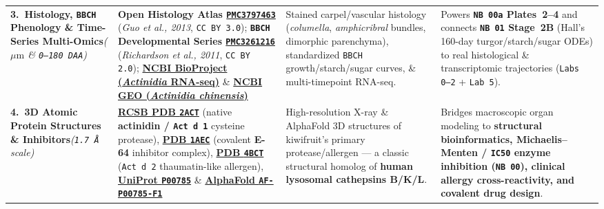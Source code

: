 \documentclass[10pt,a4paper]{article}
\begin{document}
{\begin{xltabular}{\textwidth}{L{2.55cm} L{4.85cm} L{4.25cm} Y}
\textbf{3.\ Histology, \texttt{BBCH} Phenology \& Time-Series Multi-Omics}\newline \textit{($\mu\text{m}$ \& \texttt{0--180\,DAA})} &
\textbf{Open Histology Atlas \href{https://pmc.ncbi.nlm.nih.gov/articles/PMC3797463/}{\texttt{PMC3797463}}} (\textit{Guo et al., 2013}, \texttt{CC BY 3.0}); \textbf{\texttt{BBCH} Developmental Series \href{https://pmc.ncbi.nlm.nih.gov/articles/PMC3261216/}{\texttt{PMC3261216}}} (\textit{Richardson et al., 2011}, \texttt{CC BY 2.0}); \href{https://www.ncbi.nlm.nih.gov/bioproject/?term=Actinidia+fruit+development+RNA-seq}{\textbf{NCBI BioProject (\textit{Actinidia} RNA-seq)}} \& \href{https://www.ncbi.nlm.nih.gov/gds/?term=Actinidia+chinensis}{\textbf{NCBI GEO (\textit{Actinidia chinensis})}} &
Stained carpel/vascular histology (\textit{columella}, \textit{amphicribral} bundles, dimorphic parenchyma), standardized \texttt{BBCH} growth/starch/sugar curves, \& multi-timepoint RNA-seq. &
Powers \textbf{\texttt{NB 00a} Plates~2--4} and connects \textbf{\texttt{NB 01} Stage~2B} (Hall's 160-day turgor/starch/sugar ODEs) to real histological \& transcriptomic trajectories (\texttt{Labs 0--2} + \texttt{Lab 5}). \\

\textbf{4.\ 3D Atomic Protein Structures \& Inhibitors}\newline \textit{(\texttt{1.7\,\AA} scale)} &
\href{https://www.rcsb.org/structure/2ACT}{\textbf{RCSB PDB \texttt{2ACT}}} (native \textbf{actinidin / \texttt{Act d 1}} cysteine protease), \href{https://www.rcsb.org/structure/1AEC}{\textbf{PDB \texttt{1AEC}}} (covalent \textbf{E-64} inhibitor complex), \href{https://www.rcsb.org/structure/4BCT}{\textbf{PDB \texttt{4BCT}}} (\texttt{Act d 2} thaumatin-like allergen), \href{https://www.uniprot.org/uniprotkb/P00785/entry}{\textbf{UniProt \texttt{P00785}}} \& \href{https://alphafold.ebi.ac.uk/entry/P00785}{\textbf{AlphaFold \texttt{AF-P00785-F1}}} &
High-resolution X-ray \& AlphaFold 3D structures of kiwifruit's primary protease/allergen --- a classic structural homolog of \textbf{human lysosomal cathepsins B/K/L}. &
Bridges macroscopic organ modeling to \textbf{structural bioinformatics, Michaelis--Menten / \texttt{IC50} enzyme inhibition (\texttt{NB 00}), clinical allergy cross-reactivity, and covalent drug design}. \\


\end{xltabular}}
\end{document}
